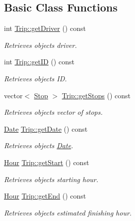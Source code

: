 \subsection*{Basic Class Functions}
\begin{DoxyCompactItemize}
\item 
int \hyperlink{group___trip_gabc996cddbc65b41987dd8d4d9776c729}{Trip\+::get\+Driver} () const
\begin{DoxyCompactList}\small\item\em Retrieves object\textquotesingle{}s driver. \end{DoxyCompactList}\item 
int \hyperlink{group___trip_ga61fea247b075bfac3f6115da4bd56ef5}{Trip\+::get\+ID} () const
\begin{DoxyCompactList}\small\item\em Retrieves object\textquotesingle{}s ID. \end{DoxyCompactList}\item 
vector$<$ \hyperlink{class_stop}{Stop} $>$ \hyperlink{group___trip_gae081fb958af544c9cad9002d5696fb33}{Trip\+::get\+Stops} () const
\begin{DoxyCompactList}\small\item\em Retrieves object\textquotesingle{}s vector of stops. \end{DoxyCompactList}\item 
\hyperlink{class_date}{Date} \hyperlink{group___trip_ga322346fb52d53fb0a94819059916d0fe}{Trip\+::get\+Date} () const
\begin{DoxyCompactList}\small\item\em Retrieves object\textquotesingle{}s \hyperlink{class_date}{Date}. \end{DoxyCompactList}\item 
\hyperlink{class_hour}{Hour} \hyperlink{group___trip_ga447efbf91bd4842daadac85d2bac4b9e}{Trip\+::get\+Start} () const
\begin{DoxyCompactList}\small\item\em Retrieves object\textquotesingle{}s starting hour. \end{DoxyCompactList}\item 
\hyperlink{class_hour}{Hour} \hyperlink{group___trip_ga6ed6b87b4206efe21fe2c6744c73061b}{Trip\+::get\+End} () const
\begin{DoxyCompactList}\small\item\em Retrieves object\textquotesingle{}s estimated finishing hour. \end{DoxyCompactList}\item 

\end{DoxyCompactItemize}
